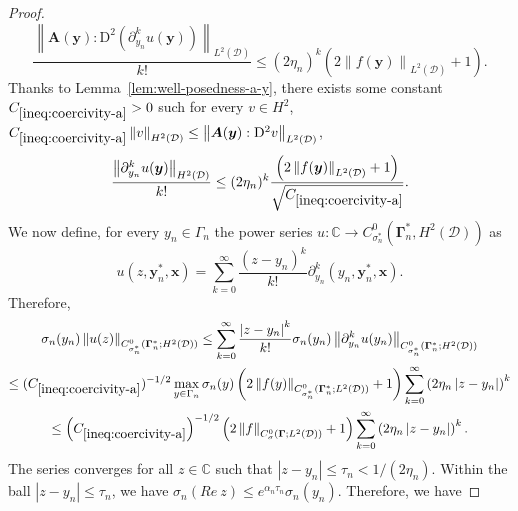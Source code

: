 \documentclass[final,onefignum,onetabnum]{mousaviart}
\begin{document}
\begin{proof}
			\begin{equation*}
				\dfrac{\left\| \boldsymbol{A}(\boldsymbol{y}): \mathrm{D}^2\left( \partial_{y_n}^k u(\boldsymbol{y}) \right) \right\|_{L^2(\mathcal{D})}}{k!}
				\leq
				(2\eta_n)^k \left( 2\left\| f(\boldsymbol{y}) \right\|_{L^2(\mathcal{D})} +  1 \right) .
			\end{equation*}
			Thanks to Lemma~\ref{lem:well-posedness-a-y}, there exists some constant $C_{\ref{ineq:coercivity-a}}>0$ such for every $v \in H^2$, $C_{\ref{ineq:coercivity-a}} \left\| v\right\|_{H^2(\mathcal{D})} \leq  \left\|\boldsymbol{A}(\boldsymbol{y}): \mathrm{D}^2v\right\|_{L^2(\mathcal{D})} $,
			\begin{equation*}
				\dfrac{\left\|  \partial_{y_n}^k u(\boldsymbol{y}) \right\|_{H^2(\mathcal{D})}}{k!}
				\leq
				(2\eta_n)^k \frac{ \left( 2\left\| f(\boldsymbol{y}) \right\|_{L^2(\mathcal{D})} +  1 \right)}{\sqrt{C_{\ref{ineq:coercivity-a}}}} .
			\end{equation*}
			We now define, for every $y_n \in \Gamma_n$ the power series $u: \mathbb{C} \rightarrow C^0_{\sigma_n^*}\left( \boldsymbol{\Gamma}_n^*, H^2(\mathcal{D}) \right) $ as 
			\begin{equation*}
				u\left( z, \boldsymbol{y}_n^*, \boldsymbol{x} \right) = \sum_{k = 0}^{\infty} \dfrac{(z - y_n)^k}{k!} \partial_{y_n}^k \left( y_n, \boldsymbol{y}_n^*, \boldsymbol{x} \right) .
			\end{equation*}
			Therefore,
			\begin{multline*}
				\sigma_n(y_n) \left\| u(z) \right\| _{C^0_{\sigma_n^*}\left( \boldsymbol{\Gamma}_n^*; H^2(\mathcal{D}) \right)}  
				\leq
				\sum_{k=0}^{\infty} \dfrac{\left| z - y_n \right|^k }{k!}\sigma_n(y_n) \left\| \partial^k_{y_n} u(y_n) \right\|_{C^0_{\sigma_n^*}\left( \boldsymbol{\Gamma}_n^*; H^2(\mathcal{D}) \right)}  
				\\ 
				\leq
				(C_{\ref{ineq:coercivity-a}})^{-1/2} 
				\max_{y \in \Gamma_n} \sigma_n(y) \left( 2 \left\| f(y)\right\| _{C^0_{\sigma_n^*}(\boldsymbol{\Gamma}_n^*; L^2(\mathcal{D}))} +1 \right)
				\sum_{k=0}^{\infty} \left( 2\eta_n \left| z-y_n \right|  \right)^k
				\\
				\leq
				\left( C_{\ref{ineq:coercivity-a}} \right)^{-1/2}\left( 2 \left\| f\right\|_{C^0_\sigma(\boldsymbol{\Gamma}; L^2(\mathcal{D}))} +1  \right)
				\sum_{k=0}^{\infty} \left(2\eta_n \left| z - y_n \right|  \right)^k .   
			\end{multline*}
			The series converges for all $z \in \mathbb{C}$ such that $\left|  z- y_n \right| \leq \tau_n <{1}/{(2 \eta_n)}$. Within the ball $\left| z - y_n \right| \leq \tau_n$, we have $\sigma_n(Re~ z) \leq e^{\alpha_n \tau_n}\sigma_n(y_n)$. Therefore, we have

\end{proof}
\end{document}
